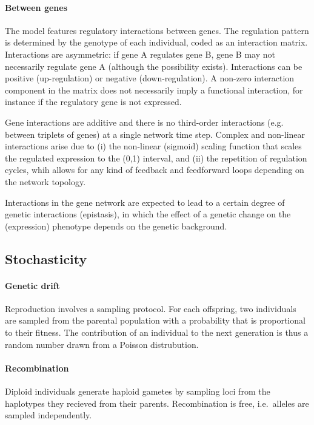 \documentclass{article}
\begin{document}
\paragraph{Between genes} The model features regulatory interactions between genes. The regulation pattern is determined by the genotype of each individual, coded as an interaction matrix. Interactions are asymmetric: if gene A regulates gene B, gene B may not necessarily regulate gene A (although the possibility exists). Interactions can be positive (up-regulation) or negative (down-regulation). A non-zero interaction component in the matrix does not necessarily imply a functional interaction, for instance if the regulatory gene is not expressed. 

Gene interactions are additive and there is no third-order interactions (e.g. between triplets of genes) at a single network time step. Complex and non-linear interactions arise due to (i) the non-linear (sigmoid) scaling function that scales the regulated expression to the (0,1) interval, and (ii) the repetition of regulation cycles, whih allows for any kind of feedback and feedforward loops depending on the network topology. 

Interactions in the gene network are expected to lead to a certain degree of genetic interactions (epistasis), in which the effect of a genetic change on the (expression) phenotype depends on the genetic background.

\subsection{Stochasticity}

\paragraph{Genetic drift} Reproduction involves a sampling protocol. For each offspring, two individuals are sampled from the parental population with a probability that is proportional to their fitness. The contribution of an individual to the next generation is thus a random number drawn from a Poisson distrubution. 

\paragraph{Recombination} Diploid individuals generate haploid gametes by sampling loci from the haplotypes they recieved from their parents. Recombination is free, i.e.\ alleles are sampled independently. 
\end{document}
